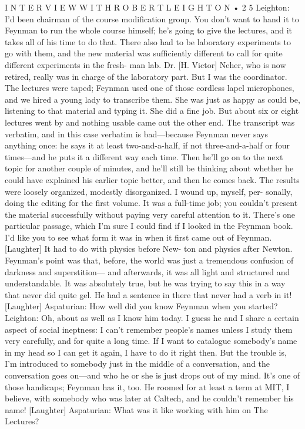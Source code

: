 \documentclass[11pt,oneside]{article}
\begin{document}
I N T E R V I E W  W I T H  R O B E R T  L E I G H T O N • 2 5 Leighton: I’d been chairman of the course modification group. You don’t want to hand it to Feynman to run the whole course himself; he’s going to give the lectures, and it takes all of his time to do that. There also had to be laboratory experiments to go with them, and the new material was sufficiently different to call for quite different experiments in the fresh- man lab. Dr. [H. Victor] Neher, who is now retired, really was in charge of the laboratory part. But I was the coordinator. The lectures were taped; Feynman used one of those cordless lapel microphones, and we hired a young lady to transcribe them. She was just as happy as could be, listening to that material and typing it. She did a fine job. But about six or eight lectures went by and nothing usable came out the other end. The transcript was verbatim, and in this case verbatim is bad---because Feynman never says anything once: he says it at least two-and-a-half, if not three-and-a-half or four times---and he puts it a different way each time. Then he’ll go on to the next topic for another couple of minutes, and he’ll still be thinking about whether he could have explained his earlier topic better, and then he comes back. The results were loosely organized, modestly disorganized. I wound up, myself, per- sonally, doing the editing for the first volume. It was a full-time job; you couldn’t present the material successfully without paying very careful attention to it. There’s one particular passage, which I’m sure I could find if I looked in the Feynman book. I’d like you to see what form it was in when it first came out of Feynman. [Laughter] It had to do with physics before New- ton and physics after Newton. Feynman’s point was that, before, the world was just a tremendous confusion of darkness and superstition--- and afterwards, it was all light and structured and understandable. It was absolutely true, but he was trying to say this in a way that never did quite gel. He had a sentence in there that never had a verb in it! [Laughter] Aspaturian: How well did you know Feynman when you started? Leighton: Oh, about as well as I know him today. I guess he and I share a certain aspect of social ineptness: I can’t remember people’s names unless I study them very carefully, and for quite a long time. If I want to catalogue somebody’s name in my head so I can get it again, I have to do it right then. But the trouble is, I’m introduced to somebody just in the middle of a conversation, and the conversation goes on---and who he or she is just drops out of my mind. It’s one of those handicaps; Feynman has it, too. He roomed for at least a term at MIT, I believe, with somebody who was later at Caltech, and he couldn’t remember his name! [Laughter] Aspaturian: What was it like working with him on The Lectures?\par
\end{document}
